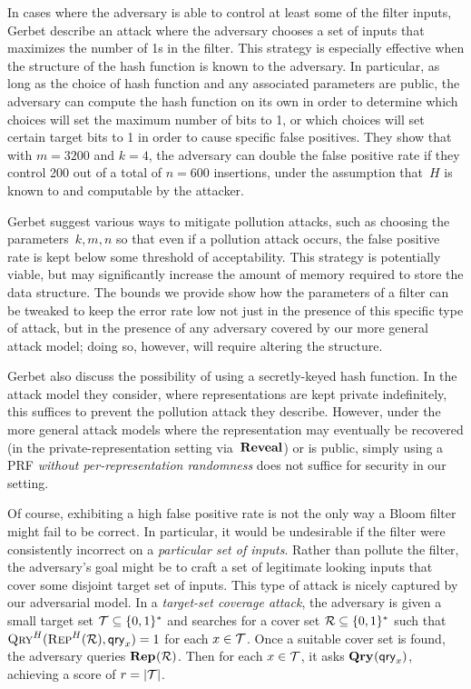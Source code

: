 In cases where the adversary is able to control at least some of the filter inputs,
Gerbet \etal describe an attack where the adversary chooses a set of
inputs that maximizes the number of 1s in the filter. This strategy is especially
effective when the structure of the hash function is known to the adversary. In
particular, as long as the choice of hash function and any associated parameters
are public, the adversary can compute the hash function on its own in order to
determine which choices will set the maximum number of bits to 1, or which
choices will set certain target bits to 1 in order to cause specific false
positives. They show that with $m = 3200$ and $k = 4$, the adversary can double
the false positive rate if they control 200 out of a total of $n = 600$
insertions, under the assumption that~$H$ is known to and
computable by the attacker.

Gerbet \etal suggest various ways to mitigate pollution attacks, such as choosing
the parameters~$k, m, n$ so that even if a pollution attack
occurs, the false positive rate is kept below some threshold of acceptability.
This strategy is  potentially viable, but may significantly increase the amount
of memory required to store the data structure.  The bounds we provide show how
the parameters of a filter can be tweaked to keep the error rate low not just in
the presence of this specific type of attack, but in the presence of any
adversary covered by our more general attack model; doing so, however, will
require altering the structure.

Gerbet \etal also discuss the possibility of using a secretly-keyed
hash function. In the attack model they consider, where representations are kept
private indefinitely, this suffices to prevent the pollution attack they
describe. However, under the more general attack models where the representation
may eventually be recovered (in the private-representation setting via~$\mathbf{Reveal}$)
or is public, simply using a PRF \emph{without per-representation randomness}
does not suffice for security in our setting.

%
Of course, exhibiting a high false positive rate is not the only way a Bloom
filter might fail to be correct. In particular, it would be undesirable if the
filter were consistently incorrect on a \emph{particular set of inputs}. Rather
than pollute the filter, the adversary's goal might be to craft a set of
legitimate looking inputs that cover some disjoint target set of inputs.
%
This type of attack is nicely captured by our adversarial model.
%
In a \emph{target-set coverage attack}, the adversary is given a small target set
$\mathcal{T}\subseteq\{0,1\}^*$ and searches for a cover set $\mathcal{R}\subseteq\{0,1\}^*$
such that $\textnormal{\textsc{Qry}}^H(\textnormal{\textsc{Rep}}^H(\mathcal{R}),\mathsf{qry}_x)=1$ for each $x\in\mathcal{T}$.
%
Once a suitable cover set is found, the adversary queries $\textup{\textbf{Rep}}\hspace{0.5pt}(\mathcal{R})$. Then
for each $x\in\mathcal{T}$, it asks $\textup{\textbf{Qry}}\hspace{0.5pt}(\mathsf{qry}_x)$, achieving a score of $r = |\mathcal{T}|$.

